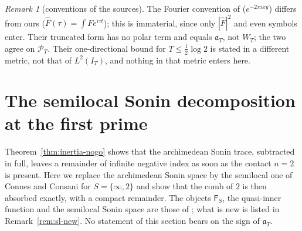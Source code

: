 \documentclass[11pt]{amsart}
\theoremstyle{definition}
\theoremstyle{remark}
\newtheorem{remark}[theorem]{Remark}
\newcommand{\PT}{\mathcal P_T}
\newcommand{\IT}{I_T}
\newcommand{\Fh}{\widehat F}
\begin{document}
\begin{remark}[conventions of the sources]\label{rem:inertia-conv}
The Fourier convention of \cite{ConnesConsani2021} ($e^{-2\pi ixy}$) differs from ours ($\Fh(\tau)=\int Fe^{i\tau t}$);
this is immaterial, since only $|\Fh|^2$ and even symbols enter. Their truncated form has no polar term and equals
$\mathfrak a_T$, not $W_T$; the two agree on $\PT$. Their one-directional bound for $T\le\frac12\log2$
\cite[\S5]{ConnesConsani2021} is stated in a different metric, not that of $L^2(\IT)$, and nothing in that metric
enters here.
\end{remark}

\section{The semilocal Sonin decomposition at the first prime}\label{sec:semilocal}

Theorem~\ref{thm:inertia-nogo} shows that the archimedean Sonin trace, subtracted in full, leaves a remainder of
infinite negative index as soon as the contact $n=2$ is present. Here we replace the archimedean Sonin space by
the semilocal one of Connes and Consani for $S=\{\infty,2\}$ and show that the comb of $2$ is then absorbed
exactly, with a compact remainder. The objects $\mathsf F_S$, the
quasi-inner function and the semilocal Sonin space are those of \cite{CCquasi2020,CCM2023}; what is new is listed in
Remark~\ref{rem:sl-new}. No statement of this section bears on the sign of $\mathfrak a_T$.
\end{document}
